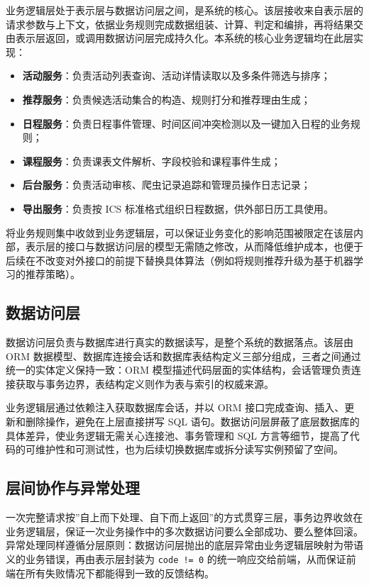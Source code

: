 \documentclass[UTF8,a4paper,12pt,fontset=none]{ctexrep}
\providecommand{\tightlist}{}
\begin{document}
业务逻辑层处于表示层与数据访问层之间，是系统的核心。该层接收来自表示层的请求参数与上下文，依据业务规则完成数据组装、计算、判定和编排，再将结果交由表示层返回，或调用数据访问层完成持久化。本系统的核心业务逻辑均在此层实现：

\begin{itemize}
\tightlist
\item
  \textbf{活动服务}：负责活动列表查询、活动详情读取以及多条件筛选与排序；
\item
  \textbf{推荐服务}：负责候选活动集合的构造、规则打分和推荐理由生成；
\item
  \textbf{日程服务}：负责日程事件管理、时间区间冲突检测以及一键加入日程的业务规则；
\item
  \textbf{课程服务}：负责课表文件解析、字段校验和课程事件生成；
\item
  \textbf{后台服务}：负责活动审核、爬虫记录追踪和管理员操作日志记录；
\item
  \textbf{导出服务}：负责按 ICS 标准格式组织日程数据，供外部日历工具使用。
\end{itemize}

将业务规则集中收敛到业务逻辑层，可以保证业务变化的影响范围被限定在该层内部，表示层的接口与数据访问层的模型无需随之修改，从而降低维护成本，也便于后续在不改变对外接口的前提下替换具体算法（例如将规则推荐升级为基于机器学习的推荐策略）。

\subsection{数据访问层}\label{ux6570ux636eux8bbfux95eeux5c42}

数据访问层负责与数据库进行真实的数据读写，是整个系统的数据落点。该层由 ORM 数据模型、数据库连接会话和数据库表结构定义三部分组成，三者之间通过统一的实体定义保持一致：ORM 模型描述代码层面的实体结构，会话管理负责连接获取与事务边界，表结构定义则作为表与索引的权威来源。

业务逻辑层通过依赖注入获取数据库会话，并以 ORM 接口完成查询、插入、更新和删除操作，避免在上层直接拼写 SQL 语句。数据访问层屏蔽了底层数据库的具体差异，使业务逻辑无需关心连接池、事务管理和 SQL 方言等细节，提高了代码的可维护性和可测试性，也为后续切换数据库或拆分读写实例预留了空间。

\subsection{层间协作与异常处理}\label{ux5c42ux95f4ux534fux4f5cux4e0eux5f02ux5e38ux5904ux7406}

一次完整请求按''自上而下处理、自下而上返回''的方式贯穿三层，事务边界收敛在业务逻辑层，保证一次业务操作中的多次数据访问要么全部成功、要么整体回滚。异常处理同样遵循分层原则：数据访问层抛出的底层异常由业务逻辑层映射为带语义的业务错误，再由表示层封装为 \texttt{code\ !=\ 0} 的统一响应交给前端，从而保证前端在所有失败情况下都能得到一致的反馈结构。
\end{document}
